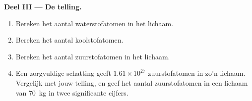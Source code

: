\begin{problem}
\medskip
\noindent\textbf{Deel III --- De telling.}
\begin{enumerate}[resume]
  \item Bereken het aantal waterstofatomen in het lichaam.
  \item Bereken het aantal koolstofatomen.
  \item Bereken het aantal zuurstofatomen in het lichaam.
  \item Een zorgvuldige schatting geeft $1.61 \times 10^{27}$
        zuurstofatomen in zo'n lichaam. Vergelijk met jouw telling, en
        geef het aantal zuurstofatomen in een lichaam van \qty{70}{kg}
        in twee significante cijfers.
\end{enumerate}
\end{problem}
